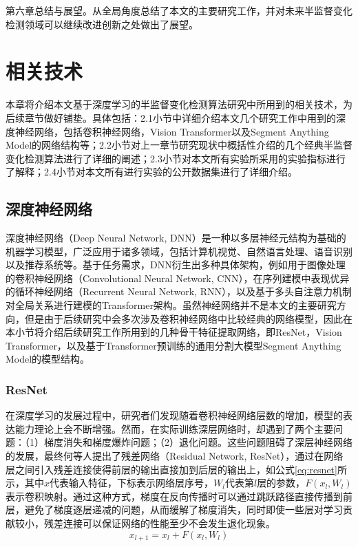 \documentclass[lang=chs, degree=master, blindreview=false, adobe=false]{yanputhesis}
\begin{document}
第六章总结与展望。从全局角度总结了本文的主要研究工作，并对未来半监督变化检测领域可以继续改进创新之处做出了展望。
\cleardoublepage
\chapter{相关技术}

本章将介绍本文基于深度学习的半监督变化检测算法研究中所用到的相关技术，为后续章节做好铺垫。具体包括：2.1小节中详细介绍本文几个研究工作中用到的深度神经网络，包括卷积神经网络，Vision Transformer以及Segment Anything Model的网络结构等；2.2小节对上一章节研究现状中概括性介绍的几个经典半监督变化检测算法进行了详细的阐述；2.3小节对本文所有实验所采用的实验指标进行了解释；2.4小节对本文所有进行实验的公开数据集进行了详细介绍。

\section{深度神经网络}
深度神经网络（Deep Neural Network, DNN）是一种以多层神经元结构为基础的机器学习模型，广泛应用于诸多领域，包括计算机视觉、自然语言处理、语音识别以及推荐系统等。基于任务需求，DNN衍生出多种具体架构，例如用于图像处理的卷积神经网络（Convolutional Neural Network, CNN），在序列建模中表现优异的循环神经网络（Recurrent Neural Network, RNN），以及基于多头自注意力机制对全局关系进行建模的Transformer架构。虽然神经网络并不是本文的主要研究方向，但是由于后续研究中会多次涉及卷积神经网络中比较经典的网络模型，因此在本小节将介绍后续研究工作所用到的几种骨干特征提取网络，即ResNet，Vision Transformer，以及基于Transformer预训练的通用分割大模型Segment Anything Model的模型结构。
\subsection{ResNet}
在深度学习的发展过程中，研究者们发现随着卷积神经网络层数的增加，模型的表达能力理论上会不断增强。然而，在实际训练深层网络时，却遇到了两个主要问题：（1）梯度消失和梯度爆炸问题；（2）退化问题。这些问题阻碍了深层神经网络的发展，最终何等人\cite{He2015ResNet}提出了残差网络（Residual Network, ResNet），通过在网络层之间引入残差连接使得前层的输出直接加到后层的输出上，如公式\ref{eq:resnet}所示，其中$x$代表输入特征，下标表示网络层序号，$W_l$代表第$l$层的参数，$F\left(x_l,W_l\right)$表示卷积映射。通过这种方式，梯度在反向传播时可以通过跳跃路径直接传播到前层，避免了梯度逐层递减的问题，从而缓解了梯度消失，同时即使一些层对学习贡献较小，残差连接可以保证网络的性能至少不会发生退化现象。
\begin{equation}
  \label{eq:resnet}
  x_{l+1} = x_l + F\left(x_l,W_l\right)
\end{equation}
\end{document}
